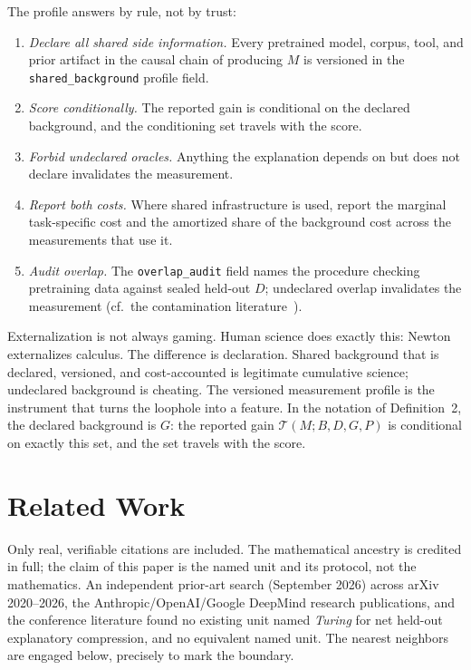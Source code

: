 \documentclass[11pt]{article}
\begin{document}
The profile answers by rule, not by trust:
\begin{enumerate}
\item \textit{Declare all shared side information.} Every pretrained model, corpus, tool, and prior artifact in the causal chain of producing \(M\) is versioned in the \texttt{shared\_background} profile field.
\item \textit{Score conditionally.} The reported gain is conditional on the declared background, and the conditioning set travels with the score.
\item \textit{Forbid undeclared oracles.} Anything the explanation depends on but does not declare invalidates the measurement.
\item \textit{Report both costs.} Where shared infrastructure is used, report the marginal task-specific cost and the amortized share of the background cost across the measurements that use it.
\item \textit{Audit overlap.} The \texttt{overlap\_audit} field names the procedure checking pretraining data against sealed held-out \(D\); undeclared overlap invalidates the measurement (cf.\ the contamination literature~\cite{sainz2023,deng2024,carlini2021}).
\end{enumerate}
Externalization is not always gaming. Human science does exactly this: Newton externalizes calculus. The difference is declaration. Shared background that is declared, versioned, and cost-accounted is legitimate cumulative science; undeclared background is cheating. The versioned measurement profile is the instrument that turns the loophole into a feature. In the notation of Definition~2, the declared background is \(G\): the reported gain \(\mathcal{T}(M;B,D,G,P)\) is conditional on exactly this set, and the set travels with the score.

\section{Related Work}

Only real, verifiable citations are included. The mathematical ancestry is credited in full; the claim of this paper is the named unit and its protocol, not the mathematics. An independent prior-art search (September 2026) across arXiv 2020--2026, the Anthropic/OpenAI/Google DeepMind research publications, and the conference literature found no existing unit named \textit{Turing} for net held-out explanatory compression, and no equivalent named unit. The nearest neighbors are engaged below, precisely to mark the boundary.
\end{document}
